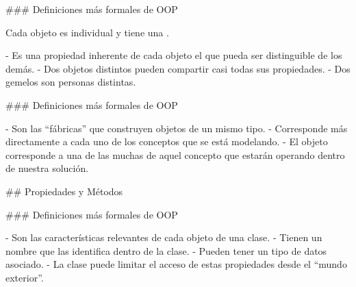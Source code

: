 ### Definiciones más formales de OOP


Cada objeto es individual y tiene una .\newline

- Es una propiedad inherente de cada objeto el que pueda ser distinguible de los demás.
- Dos objetos distintos pueden compartir casi todas sus propiedades.
    - Dos gemelos son personas distintas.


### Definiciones más formales de OOP


- Son las ``fábricas'' que construyen objetos de un mismo tipo.
- Corresponde más directamente a cada uno de los conceptos que se está modelando.
    - El objeto corresponde a una de las muchas  de aquel concepto
    que estarán operando dentro de nuestra solución.

\centering{}

## Propiedades y Métodos

### Definiciones más formales de OOP


- Son las características relevantes de cada objeto de una clase.
- Tienen un nombre que las identifica dentro de la clase.
- Pueden tener un tipo de datos asociado.
- La clase puede limitar el acceso de estas propiedades desde el ``mundo exterior''.

\centering{}

